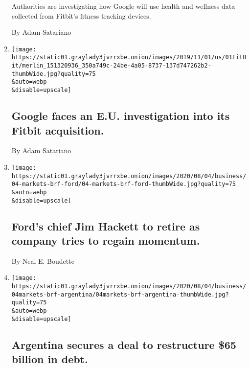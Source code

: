 \begin{enumerate}
  Authorities are investigating how Google will use health and wellness
  data collected from Fitbit's fitness tracking devices.

  By Adam Satariano
\item
  \href{/2020/08/04/business/google-faces-an-eu-investigation-into-its-fitbit-acquisition.html}{}

  \texttt{[image: https://static01.graylady3jvrrxbe.onion/images/2019/11/01/us/01FitBit/merlin\_151320936\_350a749c-24be-4a05-8737-137d747262b2-thumbWide.jpg?quality=75\\\&auto=webp\\\&disable=upscale]}

  \hypertarget{google-faces-an-eu-investigation-into-its-fitbit-acquisition}{%
  \subsection{Google faces an E.U. investigation into its Fitbit
  acquisition.}\label{google-faces-an-eu-investigation-into-its-fitbit-acquisition}}

  By Adam Satariano
\item
  \href{/2020/08/04/business/fords-chief-jim-hackett-to-retire-as-company-tries-to-regain-momentum.html}{}

  \texttt{[image: https://static01.graylady3jvrrxbe.onion/images/2020/08/04/business/04-markets-brf-ford/04-markets-brf-ford-thumbWide.jpg?quality=75\\\&auto=webp\\\&disable=upscale]}

  \hypertarget{fords-chief-jim-hackett-to-retire-as-company-tries-to-regain-momentum}{%
  \subsection{Ford's chief Jim Hackett to retire as company tries to
  regain
  momentum.}\label{fords-chief-jim-hackett-to-retire-as-company-tries-to-regain-momentum}}

  By Neal E. Boudette
\item
  \href{/2020/08/04/business/argentina-secures-a-deal-to-restructure-65-billion-in-debt.html}{}

  \texttt{[image: https://static01.graylady3jvrrxbe.onion/images/2020/08/04/business/04markets-brf-argentina/04markets-brf-argentina-thumbWide.jpg?quality=75\\\&auto=webp\\\&disable=upscale]}

  \hypertarget{argentina-secures-a-deal-to-restructure-65-billion-in-debt}{%
  \subsection{Argentina secures a deal to restructure \$65 billion in
  debt.}\label{argentina-secures-a-deal-to-restructure-65-billion-in-debt}}


\end{enumerate}
